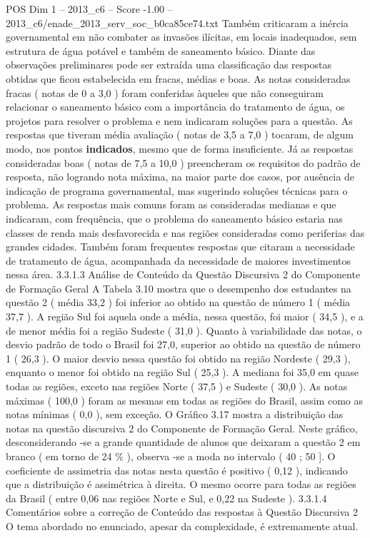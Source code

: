 \begin{textsample}{POS Dim 1 – 2013\_c6 – Score -1.00 – 2013\_c6/enade\_2013\_serv\_soc\_b0ca85ce74.txt}
Também criticaram a inércia governamental em não combater as invasões ilícitas, em locais inadequados, sem estrutura de água potável e também de saneamento básico.
Diante das observações preliminares pode ser extraída uma classificação das respostas obtidas que ficou estabelecida em fracas, médias e boas.
As notas consideradas fracas ( notas de 0 a 3,0 ) foram conferidas àqueles que não conseguiram relacionar o saneamento básico com a importância do tratamento de água, os projetos para resolver o problema e nem indicaram soluções para a questão.
As respostas que tiveram média avaliação ( notas de 3,5 a 7,0 ) tocaram, de algum modo, nos pontos \textbf{indicados}, mesmo que de forma insuficiente.
Já as respostas consideradas boas ( notas de 7,5 a 10,0 ) preencheram os requisitos do padrão de resposta, não logrando nota máxima, na maior parte dos casos, por ausência de indicação de programa governamental, mas sugerindo soluções técnicas para o problema.
As respostas mais comuns foram as consideradas medianas e que indicaram, com frequência, que o problema do saneamento básico estaria nas classes de renda mais desfavorecida e nas regiões consideradas como periferias das grandes cidades.
Também foram frequentes respostas que citaram a necessidade de tratamento de água, acompanhada da necessidade de maiores investimentos nessa área. 3.3.1.3 Análise de Conteúdo da Questão Discursiva 2 do Componente de Formação Geral A Tabela 3.10 mostra que o desempenho dos estudantes na questão 2 ( média 33,2 ) foi inferior ao obtido na questão de número 1 ( média 37,7 ).
A região Sul foi aquela onde a média, nessa questão, foi maior ( 34,5 ), e a de menor média foi a região Sudeste ( 31,0 ).
Quanto à variabilidade das notas, o desvio padrão de todo o Brasil foi 27,0, superior ao obtido na questão de número 1 ( 26,3 ).
O maior desvio nessa questão foi obtido na região Nordeste ( 29,3 ), enquanto o menor foi obtido na região Sul ( 25,3 ).
A mediana foi 35,0 em quase todas as regiões, exceto nas regiões Norte ( 37,5 ) e Sudeste ( 30,0 ).
As notas máximas ( 100,0 ) foram as mesmas em todas as regiões do Brasil, assim como as notas mínimas ( 0,0 ), sem exceção.
O Gráfico 3.17 mostra a distribuição das notas na questão discursiva 2 do Componente de Formação Geral.
Neste gráfico, desconsiderando -se a grande quantidade de alunos que deixaram a questão 2 em branco ( em torno de 24 \% ), observa -se a moda no intervalo ( 40 ; 50 ].
O coeficiente de assimetria das notas nesta questão é positivo ( 0,12 ), indicando que a distribuição é assimétrica à direita.
O mesmo ocorre para todas as regiões da Brasil ( entre 0,06 nas regiões Norte e Sul, e 0,22 na Sudeste ). 3.3.1.4 Comentários sobre a correção de Conteúdo das respostas à Questão Discursiva 2 O tema abordado no enunciado, apesar da complexidade, é extremamente atual.

\end{textsample}
